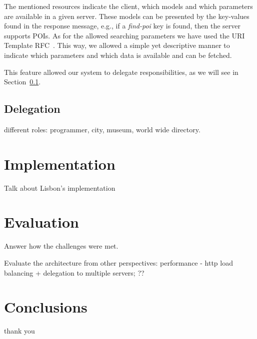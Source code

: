 \documentclass[times]{ettauth}
\begin{document}
The mentioned resources indicate the client, which models and which parameters are available in a given server. These models can be presented by the key-values found in the response message, e.g., if a \textit{find-poi} key is found, then the server supports POIs. As for the allowed searching parameters we have used the URI Template RFC~\cite{uri-template}. This way, we allowed a simple yet descriptive manner to indicate which parameters and which data is available and can be fetched.

This feature allowed our system to delegate responsibilities, as we will see in Section~\ref{delegation}.

\subsection{Delegation}
\label{delegation}
different roles: programmer, city, museum, world wide directory.


\section{Implementation}
Talk about Lisbon's implementation



\section{Evaluation}
Answer how the challenges were met.

Evaluate the architecture from other perspectives: performance - http load balancing + delegation to multiple servers; ??



\section{Conclusions}


\acks
thank you



\end{document}
